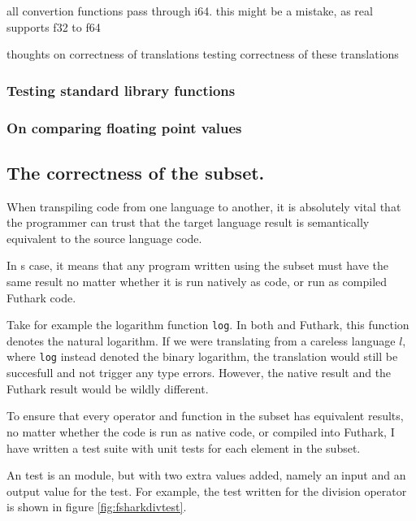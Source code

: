 all convertion functions pass through i64. this might be a mistake, as real
supports f32 to f64

thoughts on correctness of translations
testing correctness of these translations

\subsubsection*{Testing \fsharp{} standard library functions}

\subsubsection*{On comparing floating point values}


\clearpage
\subsection*{The correctness of the \fshark{} subset.}
When transpiling code from one language to another, it is absolutely vital that
the programmer can trust that the target language result
is semantically equivalent to the source language code.

In \fshark{}s case, it means that any program written using the \fshark{}
subset must have the same result no matter whether it is run natively as
\fsharp{} code, or run as \fshark{} compiled Futhark code.

Take for example the logarithm function \texttt{log}. In both \fsharp{} and
Futhark, this function denotes the natural logarithm. If we were translating
from a careless language $l$, where \texttt{log} instead denoted the binary
logarithm, the translation would still be succesfull and not trigger any type
errors.
However, the native result and the Futhark result would be wildly different.

To ensure that every operator and function in the \fshark{} subset has
equivalent results, no matter whether the \fshark{} code is run as native
\fsharp{} code, or compiled into Futhark, I have written a test suite with unit
tests for each element in the \fsharp{} subset. 

An \fshark{} test is an \fshark{} module, but with two extra values added,
namely an input and an output value for the test. For example, the test written for the
division operator is shown in figure \ref{fig:fsharkdivtest}.

